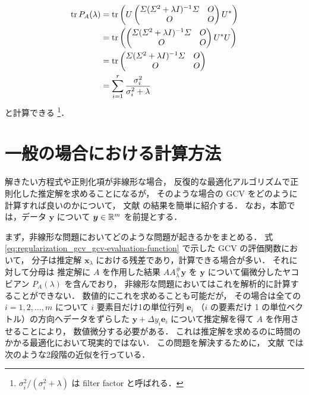 \begin{align}
    \operatorname{tr}{P_A(\lambda)}
     & = \operatorname{tr}\left(U
    \begin{pmatrix}
            \varSigma (\varSigma^2 + \lambda I)^{-1} \varSigma & O \\
            O                                         & O
        \end{pmatrix}
    U^*\right)
    \notag                                                      \\
     & = \operatorname{tr}\left(
    \begin{pmatrix}
            \varSigma (\varSigma^2 + \lambda I)^{-1} \varSigma & O \\
            O                                         & O
        \end{pmatrix}
    U^* U\right)
    \notag                                                      \\
     & = \operatorname{tr}
    \begin{pmatrix}
        \varSigma (\varSigma^2 + \lambda I)^{-1} \varSigma & O \\
        O                                         & O
    \end{pmatrix}
    \notag                                                      \\
     & = \sum_{i = 1}^r \frac{\sigma_i^2}{\sigma_i^2 + \lambda}
\end{align}
と計算できる
\cite{Hansen1998}
\footnote{$\sigma_i^2 / (\sigma_i^2 + \lambda)$ は filter factor と呼ばれる．}．

\section{一般の場合における計算方法}

解きたい方程式や正則化項が非線形な場合，
反復的な最適化アルゴリズムで正則化した推定解を求めることになるが，
そのような場合の GCV をどのように計算すれば良いのかについて，
文献 \cite{Deshpande1991} の結果を簡単に紹介する．
なお，本節では，データ $\bm{y}$ について $\bm{y} \in \mathbb{R}^m$ を前提とする．

まず，非線形な問題においてどのような問題が起きるかをまとめる．
式 \eqref{eq:regularization_gcv_gcv-evaluation-function} で示した GCV の評価関数において，
分子は推定解 $\bm{x}_\lambda$ における残差であり，計算できる場合が多い．
それに対して分母は
推定解に $A$ を作用した結果 $A A_\lambda^\#\bm{y}$ を
$\bm{y}$ について偏微分したヤコビアン $P_A(\lambda)$ を含んでおり，
非線形な問題においてはこれを解析的に計算することができない．
数値的にこれを求めることも可能だが，
その場合は全ての $i=1, 2, \ldots, m$ について
$i$ 要素目だけ1の単位行列 $\bm{e}_i$ （$i$ の要素だけ 1 の単位ベクトル）の方向へデータをずらした
$\bm{y} + \Delta y_i \bm{e}_i$ について推定解を得て
$A$ を作用させることにより，
数値微分する必要がある．
これは推定解を求めるのに時間のかかる最適化において現実的ではない．
この問題を解決するために，
文献 \cite{Deshpande1991} では次のような2段階の近似を行っている．

